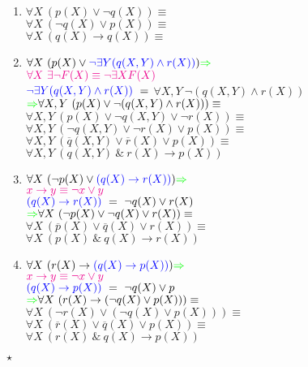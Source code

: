 \documentclass[a4paper,titlepage,oneside]{article}
\begin{document}
\begin{enumerate}
    \item $\forall X\ (p(X) \vee \neg q(X)) \equiv$ \\
          $\forall X\ (\neg q(X) \vee  p(X)) \equiv$ \\
          $\forall X\ (q(X) \rightarrow q(X)) \equiv$ \\ 
            
    
    \item $\forall X\ (p(X) \vee \textcolor{blue}{\neg \exists Y(q(X,Y)\wedge r(X))}) \textcolor{green}{\Rightarrow}$ \\
          $\textcolor{magenta}{\forall X\ \exists \neg F(X) \equiv \neg \exists X F(X)}$ \\
          $\textcolor{blue}{\neg \exists Y(q(X,Y)\wedge r(X))}\ =$ 
          $\forall X,Y\ \neg (q(X,Y) \wedge r(X))$ \\
          $\textcolor{green}{\Rightarrow} \forall X,Y\ (p(X) \vee \neg (q(X,Y) \wedge r(X))) \equiv$ \\
          $\forall X,Y\ (p(X) \vee \neg q(X,Y) \vee \neg r(X)) \equiv$ \\
          $\forall X,Y\ (\neg q(X,Y) \vee \neg r(X) \vee p(X)) \equiv$ \\ 
          $\forall X,Y\ (\overline{q}(X,Y) \vee \overline{r}(X) \vee p(X)) \equiv$ \\
          $\forall X,Y\ (q(X,Y)\ \&\ r(X) \rightarrow p(X))$           
    
    \item $\forall X\ (\neg p(X) \vee \textcolor{blue}{(q(X) \rightarrow r(X))}) \textcolor{green}{\Rightarrow}$ \\
          $\textcolor{magenta}{x \rightarrow y \equiv \neg x \vee y}$ \\
          $\textcolor{blue}{(q(X) \rightarrow r(X))}\ =\ \neg q(X) \vee r(X)$ \\
          $\textcolor{green}{\Rightarrow} \forall X\ (\neg p(X) \vee \neg q(X) \vee r(X)) \equiv$ \\
          $\forall X\ (\overline{p}(X) \vee \overline{q}(X) \vee r(X)) \equiv$ \\
          $\forall X\ (p(X)\ \&\ q(X) \rightarrow r(X))$    
    
    \item $\forall X\ (r(X) \rightarrow \textcolor{blue}{(q(X) \rightarrow p(X))}) \textcolor{green}{\Rightarrow}$ \\
          $\textcolor{magenta}{x \rightarrow y \equiv \neg x \vee y}$ \\
          $\textcolor{blue}{(q(X) \rightarrow p(X))}\ =\ \neg q(X) \vee p$ \\
          $\textcolor{green}{\Rightarrow} \forall X\ (r(X) \rightarrow (\neg q(X) \vee p(X))) \equiv$ \\
          $\forall X\ (\neg r(X) \vee (\neg q(X) \vee p(X))) \equiv$ \\
          $\forall X\ (\overline{r}(X) \vee \overline{q}(X) \vee p(X)) \equiv$ \\
          $\forall X\ (r(X)\ \&\ q(X) \rightarrow p(X))$          
\end{enumerate}
$\star$
\end{document}
